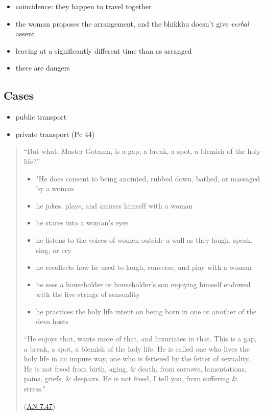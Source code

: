\begin{itemize}
\tightlist
\item
  coincidence: they happen to travel together
\item
  the woman proposes the arrangement, and the bhikkhu doesn't give
  \emph{verbal} assent
\item
  leaving at a significantly different time than as arranged
\item
  there are dangers
\end{itemize}

\subsection{Cases}

\begin{itemize}
\tightlist
\item
  public transport
\item
  private transport (Pc 44)
\end{itemize}

\clearpage

\begin{quote}
``But what, Master Gotama, is a gap, a break, a spot, a blemish of the
holy life?''

\begin{itemize}
\tightlist
\item
  "He does consent to being anointed, rubbed down, bathed, or massaged
  by a woman
\item
  he jokes, plays, and amuses himself with a woman
\item
  he stares into a woman's eyes
\item
  he listens to the voices of women outside a wall as they laugh, speak,
  sing, or cry
\item
  he recollects how he used to laugh, converse, and play with a woman
\item
  he sees a householder or householder's son enjoying himself endowed
  with the five strings of sensuality
\item
  he practices the holy life intent on being born in one or another of
  the deva hosts
\end{itemize}

``He enjoys that, wants more of that, and luxuriates in that. This is a
gap, a break, a spot, a blemish of the holy life. He is called one who
lives the holy life in an impure way, one who is fettered by the fetter
of sexuality. He is not freed from birth, aging, \& death, from sorrows,
lamentations, pains, griefs, \& despairs. He is not freed, I tell you,
from suffering \& stress.''

(\href{https://www.dhammatalks.org/suttas/AN/AN7_47.html}{AN 7.47})
\end{quote}

